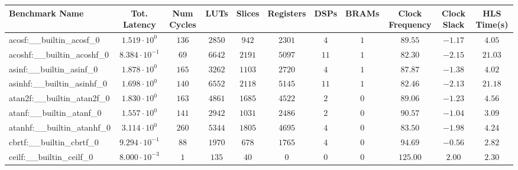 \begin{tabular}{|l|c|c|c|c|c|c|c|c|c|c|}
\hline
Benchmark Name                            & Tot. Latency            & Num Cycles & LUTs       & Slices    & Registers & DSPs    & BRAMs & Clock Frequency & Clock Slack & HLS Time(s) \\
\hline
acosf:\_\_builtin\_acosf\_0               & $ 1.519 \cdot 10^{0}  $ & $ 136    $ & $ 2850   $ & $ 942   $ & $ 2301  $ & $ 4   $ & $ 1 $ & $ 89.55       $ & $ -1.17   $ & $ 4.05    $ \\
acoshf:\_\_builtin\_acoshf\_0             & $ 8.384 \cdot 10^{-1} $ & $ 69     $ & $ 6642   $ & $ 2191  $ & $ 5097  $ & $ 11  $ & $ 1 $ & $ 82.30       $ & $ -2.15   $ & $ 21.03   $ \\
asinf:\_\_builtin\_asinf\_0               & $ 1.878 \cdot 10^{0}  $ & $ 165    $ & $ 3262   $ & $ 1103  $ & $ 2720  $ & $ 4   $ & $ 1 $ & $ 87.87       $ & $ -1.38   $ & $ 4.02    $ \\
asinhf:\_\_builtin\_asinhf\_0             & $ 1.698 \cdot 10^{0}  $ & $ 140    $ & $ 6552   $ & $ 2118  $ & $ 5145  $ & $ 11  $ & $ 1 $ & $ 82.46       $ & $ -2.13   $ & $ 21.18   $ \\
atan2f:\_\_builtin\_atan2f\_0             & $ 1.830 \cdot 10^{0}  $ & $ 163    $ & $ 4861   $ & $ 1685  $ & $ 4522  $ & $ 2   $ & $ 0 $ & $ 89.06       $ & $ -1.23   $ & $ 4.56    $ \\
atanf:\_\_builtin\_atanf\_0               & $ 1.557 \cdot 10^{0}  $ & $ 141    $ & $ 2942   $ & $ 1031  $ & $ 2486  $ & $ 2   $ & $ 0 $ & $ 90.57       $ & $ -1.04   $ & $ 3.09    $ \\
atanhf:\_\_builtin\_atanhf\_0             & $ 3.114 \cdot 10^{0}  $ & $ 260    $ & $ 5344   $ & $ 1805  $ & $ 4695  $ & $ 4   $ & $ 0 $ & $ 83.50       $ & $ -1.98   $ & $ 4.24    $ \\
cbrtf:\_\_builtin\_cbrtf\_0               & $ 9.294 \cdot 10^{-1} $ & $ 88     $ & $ 1970   $ & $ 678   $ & $ 1765  $ & $ 4   $ & $ 0 $ & $ 94.69       $ & $ -0.56   $ & $ 2.82    $ \\
ceilf:\_\_builtin\_ceilf\_0               & $ 8.000 \cdot 10^{-3} $ & $ 1      $ & $ 135    $ & $ 40    $ & $ 0     $ & $ 0   $ & $ 0 $ & $ 125.00      $ & $ 2.00    $ & $ 2.30    $ \\

\end{tabular}
